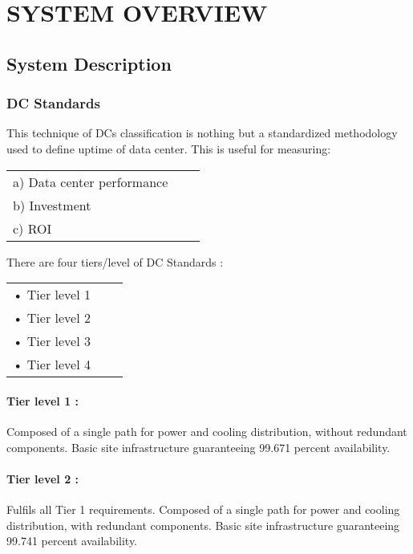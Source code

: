 \documentclass[12pt,a4paper]{report}
\begin{document}
\chapter{SYSTEM OVERVIEW}

\section{System Description}
\subsection{DC Standards}
This technique of DCs classification is nothing but a standardized methodology used to define uptime of data center. This is useful for measuring:\\
\begin{tabular}{lll}
\vspace*{0.1 in}
a) Data center performance &\\
\vspace*{0.1 in}
b) Investment &\\
\vspace*{0.1 in}
c) ROI &\\
\end{tabular}

There are four tiers/level of DC Standards :\\
\begin{tabular}{lll}
\vspace*{0.1 in}
•	Tier level 1 &\\
\vspace*{0.1 in}
•	Tier level 2 &\\
\vspace*{0.1 in}
•	Tier level 3 &\\
\vspace*{0.1 in}
•	Tier level 4 &\\
\end{tabular}

\subsubsection{Tier level 1 :} 
Composed of a single path for power and cooling distribution, without redundant components.
Basic site infrastructure guaranteeing 99.671 percent availability.

\subsubsection{Tier level 2 :}
Fulfils all Tier 1 requirements.
Composed of a single path for power and cooling distribution, with redundant components.
Basic site infrastructure guaranteeing 99.741 percent availability.
\end{document}
